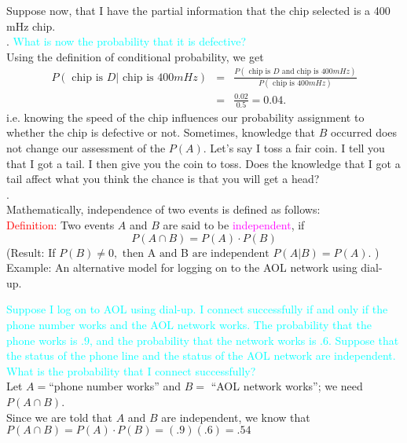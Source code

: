 \documentclass[20pt,landscape]{foils}
\newcommand{\no}{\noindent}
\begin{document}
{{\foilhead[-.8in]{\textcolor{blue}{Example 2 continued...}}
\no Suppose now, that I have the partial information that the chip 
selected is a 400 mHz chip.\\[.1in]
\no  2. {\textcolor{cyan}{What is now the probability that it is defective?}}\\[.1in]
\no Using the definition of conditional probability, we get\\[.1in] 
\begin{eqnarray*}
P( \text{ chip is } D | \text{ chip is } 400mHz) & = &\frac{P( \text{ chip is } D  \text{ and  chip is } 400mHz)}{P( \text{ chip is } 400mHz)}\\
& = & \frac{0.02}{0.5} = 0.04.
\end{eqnarray*}
\no i.e. knowing the speed of the chip influences our probability 
assignment to whether the chip is defective or not.
\foilhead[-.8in]{\textcolor{blue}{Independence of Events}}
\no Sometimes, knowledge that $B$ occurred does not change our assessment of the $P(A)$. Let's say I toss a  fair  coin. I tell you that I got a tail. I then give you the coin to toss. Does the knowledge that I got a tail affect what you think the chance is that you will get a head? \\[.1in] 
\no {\textcolor{magenta}{Intuitively, two events $A$ and $B$ are independent if the event $B$ does not have any influence on the probability that $A$ happens (and vice versa)}}.\\[.1in]  
\no Mathematically, independence of two events is defined as follows:\\[.1in] 
{\textcolor{red}{Definition:}} Two events $A$ and $B$ are said to be {\textcolor{magenta}{independent}}, if 
$$
P( A \cap B) = P(A) \cdot P(B)
$$
\no (Result: If $P(B) \neq 0, \text{ then } $A$\text{ and }$B$\text{ are independent }  P(A|B) = P(A).$ )
{ Example: } An alternative model for logging on to the AOL network using dial-up.\

\foilhead[-.8in]{\textcolor{blue}{Independence Example}}
\no {\textcolor{magenta}{Example:}}  {\textcolor{cyan}{Suppose I log on to AOL using dial-up. I connect successfully if and only if the phone number works and the AOL network works. The probability that the phone works is $.9$, and the probability that the network works is $.6$.  Suppose that the status of the phone line and the status of the AOL network are independent. What is the probability that I connect successfully?}\\[.1in]
\no Let $A=$``phone number works'' and $B=$ ``AOL network works''; we need $P(A\cap B)$.\\[.1in]
\no Since we are told that $A$ and $B$ are independent, we know that $P( A \cap B) = P(A) \cdot P(B)=(.9)(.6)=.54$\\[.1in]

}}}
\end{document}
